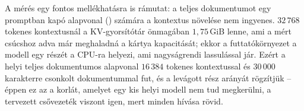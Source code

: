 A mérés egy fontos mellékhatásra is rámutat: a teljes dokumentumot egy promptban kapó alapvonal
() számára a kontextus növelése nem ingyenes. $32\,768$ tokenes kontextusnál a
KV-gyorsítótár önmagában $1{,}75$\,GiB lenne, ami a mért csúcshoz adva már meghaladná a kártya
kapacitását; ekkor a futtatókörnyezet a modell egy részét a CPU-ra helyezi, ami nagyságrendi lassulással
jár. Ezért a helyi teljes dokumentumos alapvonal $16\,384$ tokenes kontextussal és $30\,000$ karakterre
csonkolt dokumentummal fut, és a levágott rész arányát rögzítjük -- éppen ez az a korlát, amelyet egy kis
helyi modell nem tud megkerülni, a tervezett csővezeték viszont igen, mert minden hívása rövid.
